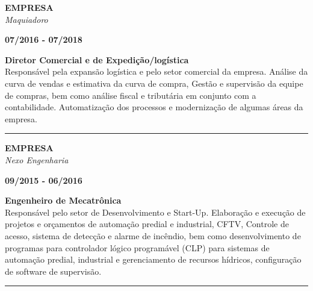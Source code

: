 \documentclass[12pt, a4paper]{article}
\newcommand{\LlinhaM}{1pt} 	 %
\newcommand{\TlinhaM}{17cm}		 %
\begin{document}
\begin{multicols}{2}
	\begin{flushleft}
		\textbf{EMPRESA}\\
		\textit{Maquiadoro}\\
	\end{flushleft}
	\vfill
	\begin{flushright}
		\textbf{07/2016 - 07/2018}\\
	\end{flushright}
\end{multicols}
\begin{flushleft}
	\textbf{Diretor Comercial e de Expedição/logística}\\
	Responsável pela expansão logística e pelo setor comercial da empresa. Análise da curva de vendas e estimativa da curva de compra,
	Gestão e supervisão da equipe de compras, bem como análise fiscal e tributária em conjunto com a contabilidade.
	Automatização dos processos e modernização de algumas áreas da empresa.
\end{flushleft}

\begin{center} %
	\rule{\TlinhaM}{\LlinhaM}
\end{center}

\begin{multicols}{2}
	\begin{flushleft}
		\textbf{EMPRESA}\\
		\textit{Nexo Engenharia}\\
	\end{flushleft}
	\vfill
	\begin{flushright}
		\textbf{09/2015 - 06/2016}\\
	\end{flushright}
\end{multicols}
\begin{flushleft}
	\textbf{Engenheiro de Mecatrônica}\\
	Responsável pelo setor de Desenvolvimento e Start-Up. Elaboração e execução de projetos e orçamentos de automação predial e industrial, CFTV, Controle de acesso, sistema de detecção e alarme de incêndio, bem como desenvolvimento de programas para controlador lógico programável (CLP) para sistemas de automação predial, industrial e gerenciamento de recursos hídricos, configuração de software de supervisão.\\
\end{flushleft}

\begin{center}%
	\rule{\TlinhaM}{\LlinhaM}
\end{center}
\end{document}
